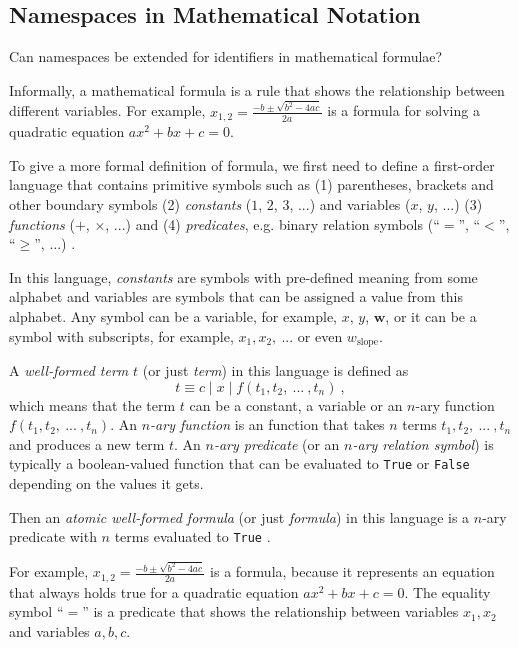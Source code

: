 

\subsection{Namespaces in Mathematical Notation}

Can namespaces be extended for identifiers in mathematical
formulae?

Informally, a mathematical formula is a rule that shows the relationship
between different variables. For example,
$x_{1,2} = \frac{-b \pm \sqrt{b^2 - 4 a c}}{2 a}$ is a formula for solving
a quadratic equation $a x^2 + b x + c = 0$.


To give a more formal definition of formula, we first need to define
a first-order language that contains primitive symbols such as
(1) parentheses, brackets and other boundary symbols
(2) \emph{constants} ($1$, $2$, $3$, ...) and variables ($x$, $y$, ...)
(3) \emph{functions} ($+$, $\times$, ...) and
(4) \emph{predicates}, e.g. binary relation symbols (``$=$'', ``$<$'', ``$\geqslant$'', ...)
\cite{barwise2000language}.

In this language, \emph{constants} are symbols with pre-defined meaning
from some alphabet and variables are symbols that can be assigned
a value from this alphabet.
Any symbol can be a variable, for example, $x$, $y$, $\mathbf w$, or it can
be a symbol with subscripts, for example, $x_1, x_2, \ ...$ or even $w_\text{slope}$.

A \emph{well-formed term} $t$ (or just \emph{term}) in this language is defined as
$$t \equiv c \mid x \mid f(t_1, t_2, \ ... \ , t_n) \ ,$$ which means that the term
$t$ can be a constant, a variable or an $n$-ary function
$f(t_1, t_2, \ ... \ , t_n)$. An  \emph{$n$-ary function} is an
function that takes $n$ terms $t_1, t_2, \ ... \ , t_n$ and produces
a new term $t$. An \emph{$n$-ary predicate} (or an \emph{$n$-ary relation symbol})
is typically a boolean-valued function that can be evaluated to \texttt{True}
or \texttt{False} depending on the values it gets.

Then an \emph{atomic well-formed formula} (or just \emph{formula}) in this language
is a $n$-ary predicate with $n$ terms evaluated to \texttt{True} \cite{barwise2000language}.

For example, $x_{1,2} = \frac{-b \pm \sqrt{b^2 - 4 a c}}{2 a}$ is a formula,
because it represents an equation that always holds true for a quadratic equation
$a x^2 + b x + c = 0$. The equality symbol ``$=$'' is a predicate that shows
the relationship between variables $x_1, x_2$ and variables $a, b, c$.

